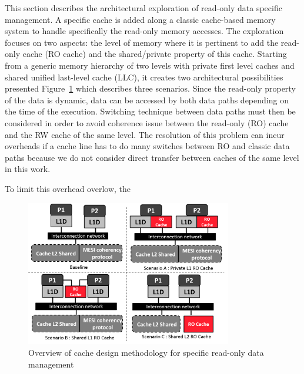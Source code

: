 \documentclass[sigconf]{acmart}
\begin{document}
This section describes the architectural exploration of read-only data
specific management. A specific cache is added along a classic
cache-based memory system to handle specifically the read-only memory
accesses. The exploration focuses on two aspects: the level of memory
where it is pertinent to add the read-only cache (RO cache) and the
shared/private property of this cache. Starting from a generic memory
hierarchy of two levels with private first level caches and shared
unified last-level cache (LLC), it creates two architectural
possibilities presented Figure~\ref{architecture} which describes
three scenarios. Since the read-only property of the data is dynamic,
data can be accessed by both data paths depending on the time of the
execution. Switching technique between data paths must then be
considered in order to avoid coherence issue between the read-only
(RO) cache and the RW cache of the same level. The resolution of this
problem can incur overheads if a cache line has to do many switches
between  RO and  classic data paths because we do not consider
direct transfer between caches of the same level in this work. 

To limit this overhead overlow, the 



\begin{figure}
    \centering
    \includegraphics[width=9cm]{./images/architecture.png}
    \caption{Overview of cache design methodology for specific read-only data management}
    \label{architecture}
\end{figure}
\end{document}
